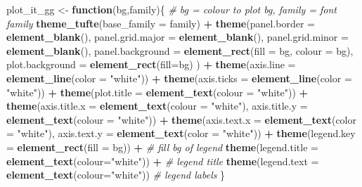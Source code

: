 \documentclass[10,portrait]{article}
\newenvironment{Shaded}{\begin{snugshade}}{\end{snugshade}}
\newcommand{\KeywordTok}[1]{\textcolor[rgb]{0.13,0.29,0.53}{\textbf{#1}}}
\newcommand{\DataTypeTok}[1]{\textcolor[rgb]{0.13,0.29,0.53}{#1}}
\newcommand{\StringTok}[1]{\textcolor[rgb]{0.31,0.60,0.02}{#1}}
\newcommand{\CommentTok}[1]{\textcolor[rgb]{0.56,0.35,0.01}{\textit{#1}}}
\newcommand{\ControlFlowTok}[1]{\textcolor[rgb]{0.13,0.29,0.53}{\textbf{#1}}}
\newcommand{\OperatorTok}[1]{\textcolor[rgb]{0.81,0.36,0.00}{\textbf{#1}}}
\newcommand{\NormalTok}[1]{#1}
\begin{document}
\begin{Shaded}
\begin{Highlighting}[]
\NormalTok{plot_it_gg <-}\StringTok{ }\ControlFlowTok{function}\NormalTok{(bg,family)\{ }\CommentTok{# bg = colour to plot bg, family = font family}
  \KeywordTok{theme_tufte}\NormalTok{(}\DataTypeTok{base_family =}\NormalTok{ family) }\OperatorTok{+}
\StringTok{  }\KeywordTok{theme}\NormalTok{(}\DataTypeTok{panel.border =} \KeywordTok{element_blank}\NormalTok{(),}
        \DataTypeTok{panel.grid.major =} \KeywordTok{element_blank}\NormalTok{(),}
        \DataTypeTok{panel.grid.minor =} \KeywordTok{element_blank}\NormalTok{(),}
        \DataTypeTok{panel.background =} \KeywordTok{element_rect}\NormalTok{(}\DataTypeTok{fill =}\NormalTok{ bg,}
                                        \DataTypeTok{colour =}\NormalTok{ bg),}
        \DataTypeTok{plot.background =} \KeywordTok{element_rect}\NormalTok{(}\DataTypeTok{fill=}\NormalTok{bg)}
\NormalTok{  ) }\OperatorTok{+}
\StringTok{    }\KeywordTok{theme}\NormalTok{(}\DataTypeTok{axis.line =} \KeywordTok{element_line}\NormalTok{(}\DataTypeTok{color =} \StringTok{"white"}\NormalTok{)) }\OperatorTok{+}
\StringTok{    }\KeywordTok{theme}\NormalTok{(}\DataTypeTok{axis.ticks =} \KeywordTok{element_line}\NormalTok{(}\DataTypeTok{color =} \StringTok{"white"}\NormalTok{)) }\OperatorTok{+}
\StringTok{    }\KeywordTok{theme}\NormalTok{(}\DataTypeTok{plot.title =} \KeywordTok{element_text}\NormalTok{(}\DataTypeTok{colour =} \StringTok{"white"}\NormalTok{)) }\OperatorTok{+}
\StringTok{    }\KeywordTok{theme}\NormalTok{(}\DataTypeTok{axis.title.x =} \KeywordTok{element_text}\NormalTok{(}\DataTypeTok{colour =} \StringTok{"white"}\NormalTok{), }
          \DataTypeTok{axis.title.y =} \KeywordTok{element_text}\NormalTok{(}\DataTypeTok{colour =} \StringTok{"white"}\NormalTok{)) }\OperatorTok{+}
\StringTok{    }\KeywordTok{theme}\NormalTok{(}\DataTypeTok{axis.text.x =} \KeywordTok{element_text}\NormalTok{(}\DataTypeTok{color =} \StringTok{"white"}\NormalTok{),}
          \DataTypeTok{axis.text.y =} \KeywordTok{element_text}\NormalTok{(}\DataTypeTok{color =} \StringTok{"white"}\NormalTok{)) }\OperatorTok{+}
\StringTok{    }\KeywordTok{theme}\NormalTok{(}\DataTypeTok{legend.key =} \KeywordTok{element_rect}\NormalTok{(}\DataTypeTok{fill =}\NormalTok{ bg)) }\OperatorTok{+}\StringTok{ }\CommentTok{# fill bg of legend}
\StringTok{    }\KeywordTok{theme}\NormalTok{(}\DataTypeTok{legend.title =} \KeywordTok{element_text}\NormalTok{(}\DataTypeTok{colour=}\StringTok{"white"}\NormalTok{)) }\OperatorTok{+}\StringTok{ }\CommentTok{# legend title}
\StringTok{    }\KeywordTok{theme}\NormalTok{(}\DataTypeTok{legend.text =} \KeywordTok{element_text}\NormalTok{(}\DataTypeTok{colour=}\StringTok{"white"}\NormalTok{)) }\CommentTok{# legend labels}
\NormalTok{\} }
\end{Highlighting}
\end{Shaded}
\end{document}
